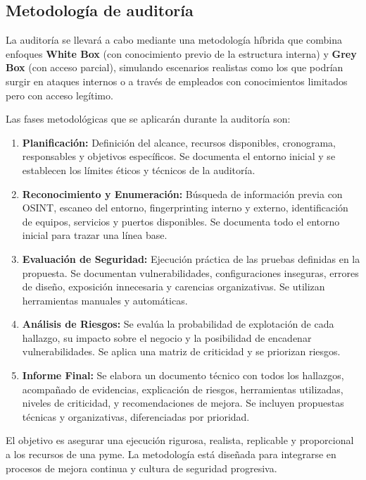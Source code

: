 \documentclass[a4paper, 10pt]{article}
\begin{document}
\subsection{Metodología de auditoría}

La auditoría se llevará a cabo mediante una metodología híbrida que combina enfoques \textbf{White Box} (con conocimiento previo de la estructura interna) y \textbf{Grey Box} (con acceso parcial), simulando escenarios realistas como los que podrían surgir en ataques internos o a través de empleados con conocimientos limitados pero con acceso legítimo.

Las fases metodológicas que se aplicarán durante la auditoría son:

\begin{enumerate}
\item \textbf{Planificación:} Definición del alcance, recursos disponibles, cronograma, responsables y objetivos específicos. Se documenta el entorno inicial y se establecen los límites éticos y técnicos de la auditoría.

\item \textbf{Reconocimiento y Enumeración:} Búsqueda de información previa con OSINT, escaneo del entorno, fingerprinting interno y externo, identificación de equipos, servicios y puertos disponibles. Se documenta todo el entorno inicial para trazar una línea base.

\item \textbf{Evaluación de Seguridad:} Ejecución práctica de las pruebas definidas en la propuesta. Se documentan vulnerabilidades, configuraciones inseguras, errores de diseño, exposición innecesaria y carencias organizativas. Se utilizan herramientas manuales y automáticas.

\item \textbf{Análisis de Riesgos:} Se evalúa la probabilidad de explotación de cada hallazgo, su impacto sobre el negocio y la posibilidad de encadenar vulnerabilidades. Se aplica una matriz de criticidad y se priorizan riesgos.

\item \textbf{Informe Final:} Se elabora un documento técnico con todos los hallazgos, acompañado de evidencias, explicación de riesgos, herramientas utilizadas, niveles de criticidad, y recomendaciones de mejora. Se incluyen propuestas técnicas y organizativas, diferenciadas por prioridad.

\end{enumerate}

El objetivo es asegurar una ejecución rigurosa, realista, replicable y proporcional a los recursos de una pyme. La metodología está diseñada para integrarse en procesos de mejora continua y cultura de seguridad progresiva.
\end{document}
